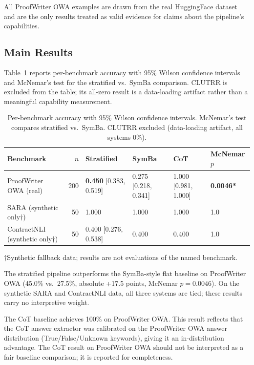 \documentclass[11pt,letterpaper]{article}
\begin{document}
All ProofWriter OWA examples are drawn from the real HuggingFace dataset and are the only
results treated as valid evidence for claims about the pipeline's capabilities.

\subsection{Main Results}

Table~\ref{tab:main} reports per-benchmark accuracy with 95\% Wilson confidence intervals and McNemar's test for the stratified vs.\ SymBa comparison.
CLUTRR is excluded from the table; its all-zero result is a data-loading artifact rather than a meaningful capability
measurement.

\begin{table}[!htbp]
\centering
\caption{Per-benchmark accuracy with 95\% Wilson confidence intervals. McNemar's test compares stratified vs.\ SymBa. CLUTRR excluded (data-loading artifact, all systems 0\%).}
\label{tab:main}
\begin{tabular}{lrllll}
\toprule
Benchmark & $n$ & Stratified & SymBa & CoT & McNemar $p$ \\
\midrule
ProofWriter OWA (real) & 200 & \textbf{0.450} [0.383, 0.519] & 0.275 [0.218, 0.341] & 1.000 [0.981, 1.000] & \textbf{0.0046*} \\
SARA (synthetic only$\dagger$) & 50 & 1.000 & 1.000 & 1.000 & 1.0 \\
ContractNLI (synthetic only$\dagger$) & 50 & 0.400 [0.276, 0.538] & 0.400 & 0.400 & 1.0 \\
\bottomrule
\end{tabular}

\smallskip
\footnotesize{$\dagger$Synthetic fallback data; results are not evaluations of the named benchmark.}
\end{table}

The stratified pipeline outperforms the SymBa-style flat baseline on ProofWriter OWA (45.0\% vs.\ 27.5\%, absolute +17.5 points, McNemar $p = 0.0046$). On the
synthetic SARA and ContractNLI data, all three systems are tied; these results carry no interpretive weight.

The CoT baseline achieves 100\% on ProofWriter OWA. This result reflects that the CoT answer extractor was calibrated on the ProofWriter
OWA answer distribution (True/False/Unknown keywords), giving it an in-distribution advantage. The CoT result on ProofWriter
OWA should not be interpreted as a fair baseline comparison; it is reported for completeness.
\end{document}
